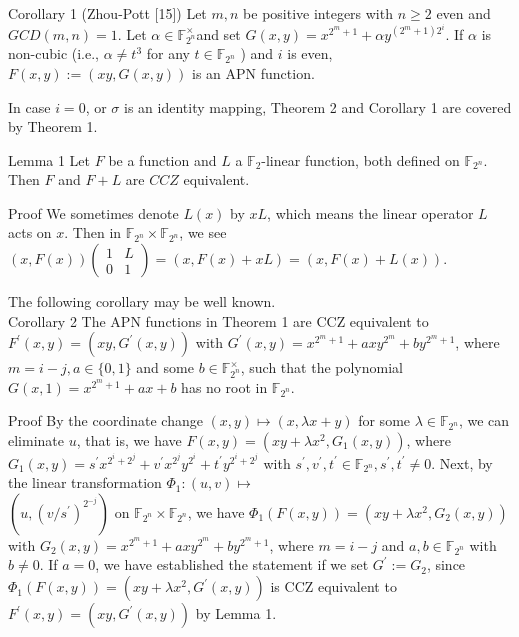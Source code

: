 \documentclass[10pt]{article}
\begin{document}
Corollary 1 (Zhou-Pott [15]) Let $m, n$ be positive integers with $n \geq 2$ even and $G C D(m, n)=1$. Let $\alpha \in \mathbb{F}_{2^{n}}^{\times}$and set $G(x, y)=x^{2^{m}+1}+\alpha y^{\left(2^{m}+1\right) 2^{i}}$. If $\alpha$ is non-cubic (i.e., $\alpha \neq t^{3}$ for any $t \in \mathbb{F}_{2^{n}}$ ) and $i$ is even, $F(x, y):=(x y, G(x, y))$ is an APN function.

In case $i=0$, or $\sigma$ is an identity mapping, Theorem 2 and Corollary 1 are covered by Theorem 1.

Lemma 1 Let $F$ be a function and $L$ a $\mathbb{F}_{2}$-linear function, both defined on $\mathbb{F}_{2^{n}}$. Then $F$ and $F+L$ are $C C Z$ equivalent.

Proof We sometimes denote $L(x)$ by $x L$, which means the linear operator $L$ acts on $x$. Then in $\mathbb{F}_{2^{n}} \times \mathbb{F}_{2^{n}}$, we see $(x, F(x))\left(\begin{array}{ll}1 & L \\ 0 & 1\end{array}\right)=(x, F(x)+x L)=(x, F(x)+L(x))$.

The following corollary may be well known.\\
Corollary 2 The APN functions in Theorem 1 are CCZ equivalent to $F^{\prime}(x, y) =\left(x y, G^{\prime}(x, y)\right)$ with $G^{\prime}(x, y)=x^{2^{m}+1}+a x y^{2^{m}}+b y^{2^{m}+1}$, where $m=i-j, a \in\{0,1\}$ and some $b \in \mathbb{F}_{2^{n}}^{\times}$, such that the polynomial $G(x, 1)=x^{2^{m}+1}+a x+b$ has no root in $\mathbb{F}_{2^{n}}$.

Proof By the coordinate change $(x, y) \mapsto(x, \lambda x+y)$ for some $\lambda \in \mathbb{F}_{2^{n}}$, we can eliminate $u$, that is, we have $F(x, y)=\left(x y+\lambda x^{2}, G_{1}(x, y)\right)$, where $G_{1}(x, y)=s^{\prime} x^{2^{i}+2^{j}}+v^{\prime} x^{2^{j}} y^{2^{i}}+ t^{\prime} y^{2^{i}+2^{j}}$ with $s^{\prime}, v^{\prime}, t^{\prime} \in \mathbb{F}_{2^{n}}, s^{\prime}, t^{\prime} \neq 0$. Next, by the linear transformation $\Phi_{1}:(u, v) \mapsto$\\
$\left(u,\left(v / s^{\prime}\right)^{2^{-j}}\right)$ on $\mathbb{F}_{2^{n}} \times \mathbb{F}_{2^{n}}$, we have $\Phi_{1}(F(x, y))=\left(x y+\lambda x^{2}, G_{2}(x, y)\right)$ with $G_{2}(x, y)= x^{2^{m}+1}+a x y^{2^{m}}+b y^{2^{m}+1}$, where $m=i-j$ and $a, b \in \mathbb{F}_{2^{n}}$ with $b \neq 0$. If $a=0$, we have established the statement if we set $G^{\prime}:=G_{2}$, since $\Phi_{1}(F(x, y))=\left(x y+\lambda x^{2}, G^{\prime}(x, y)\right)$ is CCZ equivalent to $F^{\prime}(x, y)=\left(x y, G^{\prime}(x, y)\right)$ by Lemma 1.
\end{document}
